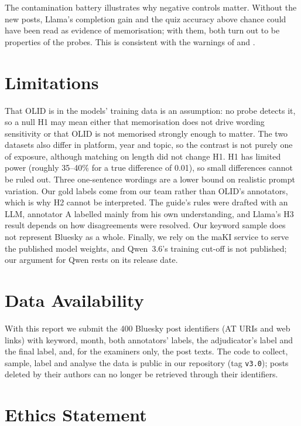 \documentclass[11pt]{article}
\begin{document}
The contamination battery illustrates why negative controls matter. Without the new posts, Llama's completion gain and the quiz accuracy above chance could have been read as evidence of memorisation; with them, both turn out to be properties of the probes. This is consistent with the warnings of \citet{duan2024membership} and \citet{zhang-etal-2026-test}.

\section{Limitations}

That OLID is in the models' training data is an assumption: no probe detects it, so a null H1 may mean either that memorisation does not drive wording sensitivity or that OLID is not memorised strongly enough to matter. The two datasets also differ in platform, year and topic, so the contrast is not purely one of exposure, although matching on length did not change H1. H1 has limited power (roughly 35--40\% for a true difference of 0.01), so small differences cannot be ruled out. Three one-sentence wordings are a lower bound on realistic prompt variation. Our gold labels come from our team rather than OLID's annotators, which is why H2 cannot be interpreted. The guide's rules were drafted with an LLM, annotator A labelled mainly from his own understanding, and Llama's H3 result depends on how disagreements were resolved. Our keyword sample does not represent Bluesky as a whole. Finally, we rely on the maKI service to serve the published model weights, and Qwen~3.6's training cut-off is not published; our argument for Qwen rests on its release date.

\section*{Data Availability}

With this report we submit the 400 Bluesky post identifiers (AT URIs and web links) with keyword, month, both annotators' labels, the adjudicator's label and the final label, and, for the examiners only, the post texts. The code to collect, sample, label and analyse the data is public in our repository (tag \texttt{v3.0}); posts deleted by their authors can no longer be retrieved through their identifiers.

\section*{Ethics Statement}
\end{document}
